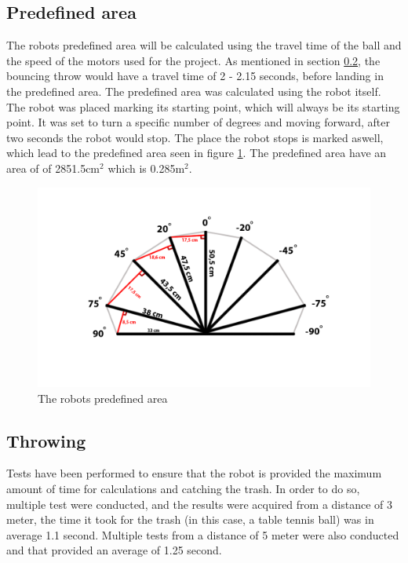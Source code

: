 \subsection{Predefined area}
\label{sec:i1Predefined areaImplementation}
The robots predefined area will be calculated using the travel time of the ball and the speed of the motors used for the project. 
As mentioned in  section \ref{sec:i1ThrowingImplementation}, the bouncing throw would have a travel time of 2 - 2.15 seconds, before landing in the predefined area. The predefined area was calculated using the robot itself. The robot was placed marking its starting point, which will always be its starting point. It was set to turn a specific number of degrees and moving forward, after two seconds the robot would stop. The place the robot stops is marked aswell, which lead to the predefined area seen in figure \ref{figure:Predefined area}. The predefined area have an area of of 2851.5cm\begin{math}^2\end{math} which is 0.285m\begin{math}^2\end{math}.

\begin{figure}[h]
\centering
\includegraphics[scale=0.35]{billeder/predefined-area}
\caption{The robots predefined area}
\label{figure:Predefined area}
\end{figure}

\subsection{Throwing}
\label{sec:i1ThrowingImplementation}
Tests have been performed to ensure that the robot is provided the maximum amount of time for calculations and catching the trash. In order to do so, multiple test were conducted, and the results were acquired from a distance of 3 meter, the time it took for the trash (in this case, a table tennis ball) was in average 1.1 second. Multiple tests from a distance of 5 meter were also conducted and that provided an average of 1.25 second. 

